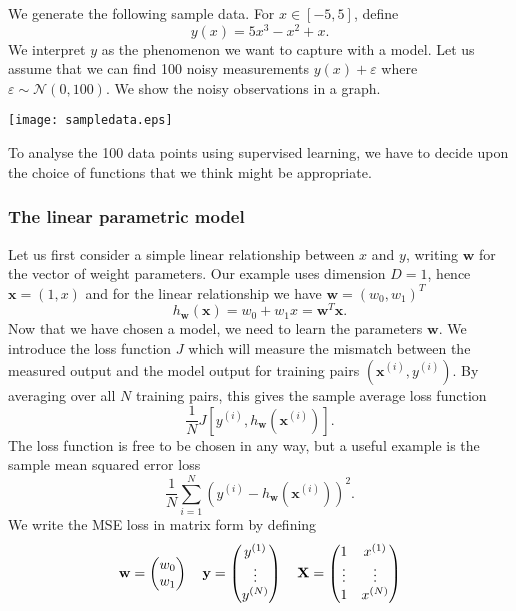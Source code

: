 \documentclass[english]{article}
\renewcommand{\epsilon}{\varepsilon}
\begin{document}
We generate the following sample data. For $x\in[-5,5]$, define
\begin{equation}\label{firstexample}
	y(x) = 5x^3-x^2+x.
\end{equation}
We interpret $y$ as the phenomenon we want to capture with a model. Let us assume that we can find 100 noisy measurements $y(x)+\epsilon$ where $\epsilon\sim \mathcal{N}(0,100)$. We show the noisy observations in a graph.
\begin{center}
\texttt{[image: sampledata.eps]}
\end{center}
To analyse the 100 data points using supervised learning, we have to decide upon the choice of functions that we think might be appropriate. 
\subsubsection{The linear parametric model}
Let us first consider a simple linear relationship between $x$ and $y$, writing $\textbf{w}$ for the vector of weight parameters. Our example uses dimension $D=1$, hence $\textbf{x} = (1, x)$ and for the linear relationship we have $\textbf{w}=(w_0,w_1)^T$ 
\begin{equation}\label{linrel}
	h_\textbf{w}(\textbf{x})=w_0+w_1x = \textbf{w}^T\textbf{x}.
\end{equation}
Now that we have chosen a model, we need to learn the parameters $\textbf{w}$. We introduce the loss function $J$ which will measure the mismatch between the measured output and the model output for training pairs $(\textbf{x}^{(i)},y^{(i)})$. By averaging over all $N$ training pairs, this gives the sample average loss function
\begin{equation}
	\frac{1}{N} J \left[y^{(i)}, h_\textbf{w}\left( \textbf{x}^{(i)}\right)\right].
\end{equation}
The loss function is free to be chosen in any way, but a useful example is the sample mean squared error loss
\begin{equation}
\frac{1}{N}  \sum_{i=1}^N \left(y^{(i)} - h_\textbf{w}\left( \textbf{x}^{(i)}\right)\right)^2.
\end{equation}
We write the MSE loss in matrix form by defining 
\begin{align*}
\textbf{w} = \begin{pmatrix}
w_0 \\ w_1
\end{pmatrix} \quad
\textbf{y} = \begin{pmatrix}
y^{(1)} \\ \vdots \\ y^{(N)}
\end{pmatrix} \quad
\textbf{\textbf{X}} = \begin{pmatrix}
1 & {x}^{(1)} \\ \vdots & \vdots \\ 1 & {x}^{(N)}
\end{pmatrix}
\end{align*}
\end{document}
